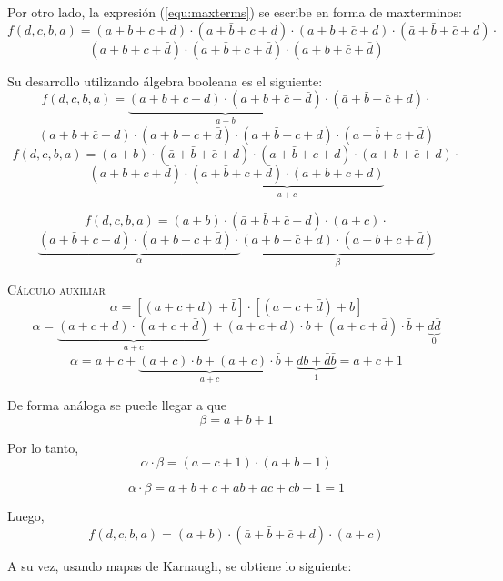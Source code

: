 \documentclass[a4paper]{article}
\begin{document}
\begin{center}
Por otro lado, la expresión (\ref{equ:maxterms}) se escribe en forma de maxterminos:
\[
	f \left( d,c,b,a \right) = \left( a + b + c + d \right) \cdot \left( a + \bar{b} + c + d\right) \cdot \left( a + b+ \bar{c} + d \right) \cdot \left( \bar{a} + \bar{b} + \bar{c} + d \right) \cdot
\]
\[
	\left( a + b + c + \bar{d} \right) \cdot \left( a + \bar{b} + c + \bar{d} \right) \cdot \left( a + b + \bar{c} +\bar{d} \right)
\]

Su desarrollo utilizando álgebra booleana es el siguiente:
\[
	f \left( d,c,b,a \right) = \underbrace{\left( a + b + c + d \right) \cdot \left( a + b + \bar{c} +\bar{d} \right)}_{a + b} \cdot 
	\left( \bar{a} + \bar{b} + \bar{c} + d \right) \cdot 
\]
\[
	\left( a + b + \bar{c} + d \right) \cdot
	\left( a + b + c + \bar{d} \right) \cdot 
	\left( a + \bar{b} + c + d\right) \cdot 
	\left( a + \bar{b} + c + \bar{d} \right)
\]
\[
	f \left( d,c,b,a \right) = \left( a + b \right) \cdot \left( \bar{a} + \bar{b} + \bar{c} + d \right) \cdot 
	\left( a + \bar{b} + c + d\right) \cdot \left( a + b + \bar{c} + d \right) \cdot
\]
\[
	\left( a + b + c + \bar{d} \right) \cdot \underbrace{\left( a + \bar{b} + c + \bar{d} \right)  \cdot \left( a + b + c + d \right)}_{a + c}
\]

\[
	f \left( d,c,b,a \right) = \left( a + b \right) \cdot \left( \bar{a} + \bar{b} + \bar{c} + d \right) \cdot 
	\left( a + c \right) \cdot
\]
\[
	\underbrace{\left( a + \bar{b} + c + d\right) \cdot \left( a + b + c + \bar{d} \right)\cdot}_{\alpha}
	\underbrace{\left( a + b + \bar{c} + d \right) \cdot \left( a + b + c + \bar{d} \right)}_{\beta}
\]

\textsc{Cálculo auxiliar}
\[
	\alpha = \left[ \left( a + c + d \right) + \bar{b} \right] \cdot 
	\left[ \left( a + c + \bar{d} \right) + b \right]  
\]
\[
	\alpha = \underbrace{\left( a + c + d \right) \cdot \left( a + c + \bar{d} \right)}_{a + c}
	+ \left( a + c + d \right) \cdot b + \left( a + c + \bar{d} \right) \cdot \bar{b} +
	\underbrace{d \bar{d}}_{0}	
\]
\[
	\alpha = a + c + \underbrace{\left( a + c \right) \cdot b + \left( a + c \right) \cdot \bar{b}}_{a + c} 
	+ \underbrace{db + \bar{d}\bar{b}}_{1}	= a + c + 1
\]

De forma análoga se puede llegar a que
\[	\beta = a + b + 1 \]

Por lo tanto,
\[
	\alpha \cdot \beta = \left( a + c + 1 \right) \cdot \left( a + b + 1 \right)
\]

\[
	\alpha \cdot \beta = a + b + c + ab + ac + cb + 1 = 1
\]

Luego,
\begin{equation}
f \left( d,c,b,a \right) = \left( a + b \right) \cdot \left( \bar{a} + \bar{b} + \bar{c} + d \right) \cdot 
	\left( a + c \right)
	\label{equ:boolmax}
\end{equation}

A su vez, usando mapas de Karnaugh, se obtiene lo siguiente:

\end{center}

\end{document}
